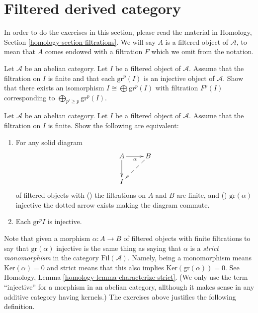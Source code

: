 \section{Filtered derived category}
\label{section-filtered-derived}

\noindent
In order to do the exercises in this section, please read the material
in Homology, Section \ref{homology-section-filtrations}. We will say
$A$ is a filtered object of $\mathcal{A}$, to mean that $A$ comes endowed
with a filtration $F$ which we omit from the notation.

\begin{exercise}
\label{exercise-split-injective}
Let $\mathcal{A}$ be an abelian category.
Let $I$ be a filtered object of $\mathcal{A}$.
Assume that the filtration on $I$ is finite
and that each $\text{gr}^p(I)$ is an injective object of $\mathcal{A}$.
Show that there exists an isomorphism
$I \cong \bigoplus \text{gr}^p(I)$ with filtration
$F^p(I)$ corresponding to $\bigoplus_{p' \geq p} \text{gr}^p(I)$.
\end{exercise}

\begin{exercise}
\label{exercise-filtered-injective}
Let $\mathcal{A}$ be an abelian category.
Let $I$ be a filtered object of $\mathcal{A}$.
Assume that the filtration on $I$ is finite.
Show the following are equivalent:
\begin{enumerate}
\item For any solid diagram
$$
\xymatrix{
A \ar[r]_\alpha \ar[d] & B \ar@{-->}[ld] \\
I &
}
$$
of filtered objects with
() the filtrations on $A$ and $B$ are finite,
and () $\text{gr}(\alpha)$ injective the
dotted arrow exists making the diagram commute.
\item Each $\text{gr}^p I$ is injective.
\end{enumerate}
\end{exercise}

\noindent
Note that given a morphism $\alpha : A \to B$ of filtered objects
with finite filtrations to say that $\text{gr}(\alpha)$ injective
is the same thing as saying that $\alpha$ is a {\it strict monomorphism}
in the category $\text{Fil}(\mathcal{A})$. Namely,
being a monomorphism means $\text{Ker}(\alpha) = 0$ and strict means that
this also implies $\text{Ker}(\text{gr}(\alpha)) = 0$.
See Homology, Lemma \ref{homology-lemma-characterize-strict}.
(We only use the term ``injective'' for a morphism in an abelian category,
allthough it makes sense in any additive category having kernels.)
The exercises above justifies the following definition.

